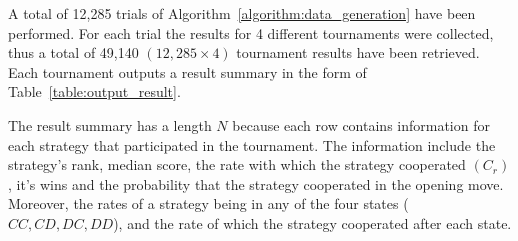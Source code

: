 \documentclass{article}
\begin{document}
A total of 12,285 trials of Algorithm~\ref{algorithm:data_generation} have been
performed. For each trial the results for 4 different tournaments were collected,
thus a total of 49,140 $(12,285 \times 4)$ tournament results have been
retrieved. Each tournament outputs a result summary in the form of
Table~\ref{table:output_result}.

The result summary has a length \(N\) because each row contains information for
each strategy that participated in the tournament. The information include the
strategy's rank, median score, the rate with which the strategy cooperated
$(C_r)$, it's wins and the probability that the strategy cooperated in the
opening move. Moreover, the rates of a strategy being in any of the four states
($CC, CD, DC, DD$), and the rate of which the strategy cooperated after each
state.

\begin{table}[!htbp]
    \begin{center}
\end{center}
\caption{Output result.}\label{table:output_result}
\end{table}
\end{document}
